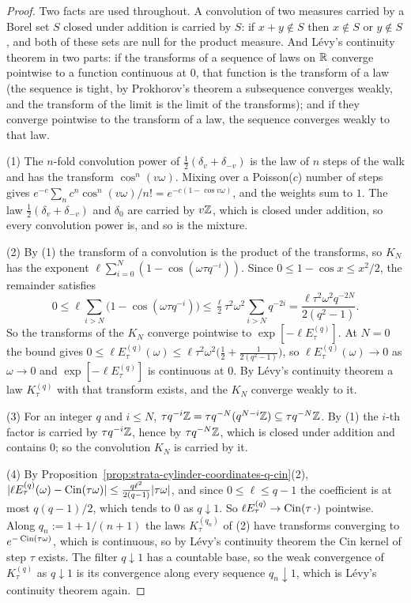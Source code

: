 \begin{proof}
Two facts are used throughout. A convolution of two measures carried by a Borel set $S$ closed
under addition is carried by $S$: if $x + y \notin S$ then $x \notin S$ or $y \notin S$, and both
of these sets are null for the product measure. And Lévy's continuity theorem in two parts: if the
transforms of a sequence of laws on $\mathbb{R}$ converge pointwise to a function continuous at $0$, that
function is the transform of a law (the sequence is tight, by Prokhorov's theorem a subsequence
converges weakly, and the transform of the limit is the limit of the transforms); and if they
converge pointwise to the transform of a law, the sequence converges weakly to that law.

(1) The $n$-fold convolution power of $\tfrac12(\delta_v + \delta_{-v})$ is the law of $n$ steps of
the walk and has the transform $\cos^n(v\omega)$. Mixing over a Poisson($c$) number of steps gives
$e^{-c}\sum_nc^n\cos^n(v\omega)/n! = e^{-c(1 - \cos v\omega)}$, and the weights sum to $1$. The law
$\tfrac12(\delta_v + \delta_{-v})$ and $\delta_0$ are carried by $v\mathbb{Z}$, which is closed under
addition, so every convolution power is, and so is the mixture.

(2) By (1) the transform of a convolution is the product of the transforms, so $K_N$ has the
exponent $\ell\sum_{i=0}^N(1 - \cos(\omega\tau q^{-i}))$. Since
$0 \le 1 - \cos x \le x^2/2$, the remainder satisfies
\[
  0 \le \ell\sum_{i > N}\bigl(1 - \cos(\omega\tau q^{-i})\bigr)
  \le \tfrac\ell2\tau^2\omega^2\sum_{i>N}q^{-2i} = \frac{\ell\tau^2\omega^2q^{-2N}}{2(q^2 - 1)} .
\]
So the transforms of the $K_N$ converge pointwise to $\exp[-\ell E^{(q)}_\tau]$. At $N = 0$ the
bound gives $0 \le \ell E^{(q)}_\tau(\omega) \le \ell\tau^2\omega^2\bigl(\tfrac12 + \tfrac1{2(q^2 - 1)}\bigr)$,
so $\ell E^{(q)}_\tau(\omega) \to 0$ as $\omega \to 0$ and $\exp[-\ell E^{(q)}_\tau]$ is continuous
at $0$. By Lévy's continuity theorem a law $K^{(q)}_\tau$ with that transform exists, and the $K_N$
converge weakly to it.

(3) For an integer $q$ and $i \le N$, $\tau q^{-i}\mathbb{Z} = \tau q^{-N}(q^{N-i}\mathbb{Z}) \subseteq \tau q^{-N}\mathbb{Z}$.
By (1) the $i$-th factor is carried by $\tau q^{-i}\mathbb{Z}$, hence by $\tau q^{-N}\mathbb{Z}$, which is closed
under addition and contains $0$; so the convolution $K_N$ is carried by it.

(4) By Proposition~\ref{prop:strata-cylinder-coordinates-q-cin}(2),
$|\ell E^{(q)}_\tau(\omega) - \operatorname{Cin}(\tau\omega)| \le \frac{q\ell^2}{2(q - 1)}|\tau\omega|$, and since
$0 \le \ell \le q - 1$ the coefficient is at most $q(q - 1)/2$, which tends to $0$ as $q \downarrow 1$.
So $\ell E^{(q)}_\tau \to \operatorname{Cin}(\tau\,\cdot)$ pointwise. Along $q_n := 1 + 1/(n + 1)$ the laws
$K^{(q_n)}_\tau$ of (2) have transforms converging to $e^{-\operatorname{Cin}(\tau\omega)}$, which is continuous,
so by Lévy's continuity theorem the Cin kernel of step $\tau$ exists. The filter $q \downarrow 1$
has a countable base, so the weak convergence of $K^{(q)}_\tau$ as $q \downarrow 1$ is its
convergence along every sequence $q_n \downarrow 1$, which is Lévy's continuity theorem again.


\end{proof}
